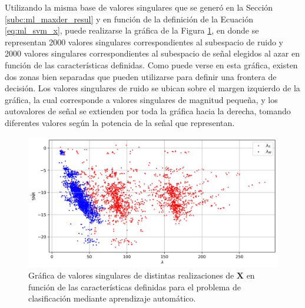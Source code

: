 Utilizando la misma base de valores singulares que se generó en la Sección \ref{subc:ml_maxder_resul} y en función de la definición de la Ecuación \ref{eq:ml_svm_x}, puede realizarse la gráfica de la Figura \ref{fig:ml_avals_plot}, en donde se representan 2000 valores singulares correspondientes al subespacio de ruido y 2000 valores singulares correspondientes al subespacio de señal elegidos al azar en función de las características definidas. Como puede verse en esta gráfica, existen dos zonas bien separadas que pueden utilizarse para definir una frontera de decisión. Los valores singulares de ruido se ubican sobre el margen izquierdo de la gráfica, la cual corresponde a valores singulares de magnitud pequeña, y los autovalores de señal se extienden por toda la gráfica hacia la derecha, tomando diferentes valores según la potencia de la señal que representan.
\begin{figure}[ht!]
  \centering
  \includegraphics[width=0.9\linewidth]{images/05-Machine Learning/ml_avals_plot.png}
  \caption{Gráfica de valores singulares de distintas realizaciones de $\mathbf{X}$ en función de las características definidas para el problema de clasificación mediante aprendizaje automático.}
  \label{fig:ml_avals_plot}
\end{figure}

